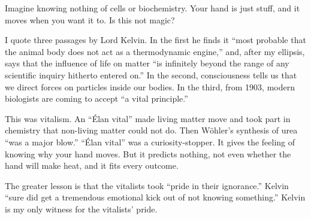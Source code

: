 
Imagine knowing nothing of cells or biochemistry. Your hand is just stuff, and it moves when you want it to. Is this not magic?

I quote three passages by Lord Kelvin. In the first he finds it ``most probable that the animal body does not act as a thermodynamic engine,'' and, after my ellipsis, says that the influence of life on matter ``is infinitely beyond the range of any scientific inquiry hitherto entered on.''  In the second, consciousness tells us that we direct forces on particles inside our bodies. In the third, from 1903, modern biologists are coming to accept ``a vital principle.'' 

This was vitalism. An ``Élan vital'' made living matter move and took part in chemistry that non-living matter could not do. Then Wöhler's synthesis of urea ``was a major blow.''  ``Élan vital'' was a curiosity-stopper. It gives the feeling of knowing why your hand moves. But it predicts nothing, not even whether the hand will make heat, and it fits every outcome. 

The greater lesson is that the vitalists took ``pride in their ignorance.'' Kelvin ``sure did get a tremendous emotional kick out of not knowing something.'' Kelvin is my only witness for the vitalists' pride.

